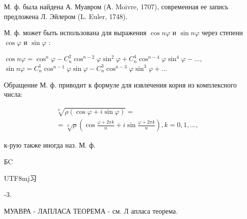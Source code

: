 \documentclass[10pt]{article}
\begin{document}
М. ф. была найдена А. Муавром (А. Moivre, 1707), современная ее запись предложена Л. Эйлером (L. Euler, 1748).



М. ф. может быть использована для выражения $\cos n \varphi$ и $\sin n \varphi$ через степени $\cos \varphi$ и $\sin \varphi$ :



$\cos n \varphi=\cos ^{n} \varphi-C_{n}^{2} \cos ^{n-2} \varphi \sin ^{2} \varphi+C_{n}^{4} \cos ^{n-4} \varphi \sin ^{4} \varphi-\ldots$, $\sin n \varphi=C_{n}^{1} \cos ^{n-1} \varphi \sin \varphi-C_{n}^{3} \cos ^{n-3} \varphi \sin ^{3} \varphi+\ldots$



Обращение М. ф. приводит к формуле для извлечения корня из комплексного числа:



\[

\begin{gathered}

\sqrt[n]{\rho(\cos \varphi+i \sin \varphi)}= \\

=\sqrt[n]{\rho}\left(\cos \frac{\varphi+2 \pi k}{n}+i \sin \frac{\varphi+2 \pi k}{n}\right), k=0,1, \ldots,

\end{gathered}

\]



к-рую также иногда наз. М. ф.



БC\begin{CJK}{UTF8}{mj}习\end{CJK}-3.



МУАВРА - ЛАПЛАСА ТЕОРЕМА - см. Л апласа теорема.
\end{document}
